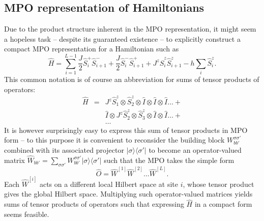 \documentclass[a4paper,10pt,oneside,onecolumn,1p,times]{elsarticle}
\newcommand{\bra}[1]{\mbox{$\langle #1  |$}}
\newcommand{\ket}[1]{\mbox{$| #1  \rangle$}}
\begin{document}
\subsection{MPO representation of Hamiltonians}
Due to the product structure inherent in the MPO representation, it might seem a hopeless task  -- despite its guaranteed existence -- to explicitly construct a compact MPO representation for a Hamiltonian such as
\begin{equation}
\hat{H} = \sum_{i=1}^{L-1} \frac{J}{2}\hat{S}^+_i \hat{S}^-_{i+1} + \frac{J}{2}\hat{S}^-_i \hat{S}^+_{i+1} + J^z \hat{S}^z_i \hat{S}^z_{i+1} - h\sum_{i} \hat{S}^z_i .
\end{equation}
This common notation is of course an abbreviation for sums of tensor products of operators:
\begin{eqnarray*}
\hat{H} &=& J^z\hat{S}^z_1 \otimes \hat{S}^z_2 \otimes \hat{I} \otimes \hat{I} \otimes \hat{I} \ldots + \\
 & & \hat{I} \otimes J^z\hat{S}^z_2 \otimes \hat{S}^z_3 \otimes \hat{I} \otimes \hat{I} \ldots + \\
 & & \ldots
 \end{eqnarray*}
It is however surprisingly easy to express this sum of tensor products in MPO form \cite{McCulloch07} -- to this purpose it is convenient to reconsider the building block $W^{\sigma\sigma'}_{bb'}$ combined with its associated projector $\ket{\sigma}\bra{\sigma'}$ to become an operator-valued matrix $\hat{W}_{bb'} = \sum_{\sigma\sigma'} W^{\sigma\sigma'}_{bb'} \ket{\sigma}\bra{\sigma'}$ such that the MPO takes the simple form
\begin{equation}
\hat{O} = \hat{W}^{[1]}\hat{W}^{[2]} \ldots \hat{W}^{[L]} .
\end{equation}
Each $\hat{W}^{[i]}$ acts on a different local Hilbert space at site $i$, whose tensor product gives the global Hilbert space. Multiplying such operator-valued matrices yields sums of tensor products of operators such that expressing $\hat{H}$ in a compact form seems feasible. 
\end{document}
